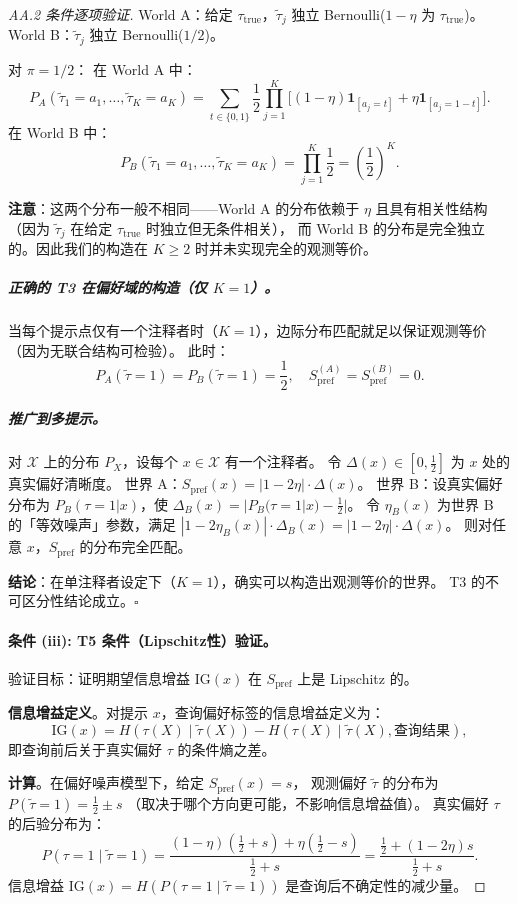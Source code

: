 \documentclass[12pt,a4paper]{article}
\newcommand{\cX}{\mathcal{X}}
\newcommand{\ind}[1]{\mathbf{1}_{[#1]}}
\begin{document}
\begin{proof}[AA.2 条件逐项验证]
World A：给定 $\tau_{\mathrm{true}}$，$\tilde{\tau}_j$ 独立 Bernoulli($1-\eta$ 为 $\tau_{\mathrm{true}}$)。
World B：$\tilde{\tau}_j$ 独立 Bernoulli($1/2$)。

对 $\pi=1/2$：
在 World A 中：
\[
P_A(\tilde{\tau}_1=a_1,\dots,\tilde{\tau}_K=a_K) = \sum_{t\in\{0,1\}} \frac12 \prod_{j=1}^K
\bigl[(1-\eta)\ind{a_j=t} + \eta\ind{a_j=1-t}\bigr].
\]
在 World B 中：
\[
P_B(\tilde{\tau}_1=a_1,\dots,\tilde{\tau}_K=a_K) = \prod_{j=1}^K \frac12 = \left(\frac12\right)^K.
\]

\textbf{注意}：这两个分布一般不相同——World A 的分布依赖于 $\eta$ 且具有相关性结构
（因为 $\tilde{\tau}_j$ 在给定 $\tau_{\mathrm{true}}$ 时独立但无条件相关），
而 World B 的分布是完全独立的。因此我们的构造在 $K\geq2$ 时并未实现完全的观测等价。

\subparagraph{正确的 T3 在偏好域的构造（仅 $K=1$）。}
当每个提示点仅有一个注释者时（$K=1$），边际分布匹配就足以保证观测等价（因为无联合结构可检验）。
此时：
\[
P_A(\tilde{\tau}=1) = P_B(\tilde{\tau}=1) = \frac12,\quad
S_{\mathrm{pref}}^{(A)} = S_{\mathrm{pref}}^{(B)} = 0.
\]

\subparagraph{推广到多提示。}
对 $\cX$ 上的分布 $P_X$，设每个 $x\in\cX$ 有一个注释者。
令 $\Delta(x) \in [0,\frac12]$ 为 $x$ 处的真实偏好清晰度。
世界 A：$S_{\mathrm{pref}}(x) = |1-2\eta|\cdot\Delta(x)$。
世界 B：设真实偏好分布为 $P_B(\tau=1|x)$，使 $\Delta_B(x) = |P_B(\tau=1|x) - \frac12|$。
令 $\eta_B(x)$ 为世界 B 的「等效噪声」参数，满足 $|1-2\eta_B(x)|\cdot\Delta_B(x) = |1-2\eta|\cdot\Delta(x)$。
则对任意 $x$，$S_{\mathrm{pref}}$ 的分布完全匹配。

\textbf{结论}：在单注释者设定下（$K=1$），确实可以构造出观测等价的世界。
T3 的不可区分性结论成立。\hfill$\square$

\paragraph{条件 (iii): T5 条件（Lipschitz性）验证。}

验证目标：证明期望信息增益 $\mathrm{IG}(x)$ 在 $S_{\mathrm{pref}}$ 上是 Lipschitz 的。

\textbf{信息增益定义}。对提示 $x$，查询偏好标签的信息增益定义为：
\[
\mathrm{IG}(x) = H(\tau(X) \mid \tilde{\tau}(X)) - H(\tau(X) \mid \tilde{\tau}(X), \text{查询结果}),
\]
即查询前后关于真实偏好 $\tau$ 的条件熵之差。

\textbf{计算}。在偏好噪声模型下，给定 $S_{\mathrm{pref}}(x)=s$，
观测偏好 $\tilde{\tau}$ 的分布为 $P(\tilde{\tau}=1) = \frac12 \pm s$
（取决于哪个方向更可能，不影响信息增益值）。
真实偏好 $\tau$ 的后验分布为：
\[
P(\tau=1 \mid \tilde{\tau}=1) = \frac{(1-\eta)(\frac12+s) + \eta(\frac12-s)}{\frac12+s} = \frac{\frac12 + (1-2\eta)s}{\frac12+s}.
\]
信息增益 $\mathrm{IG}(x) = H(P(\tau=1\mid\tilde{\tau}=1))$ 是查询后不确定性的减少量。


\end{proof}
\end{document}
